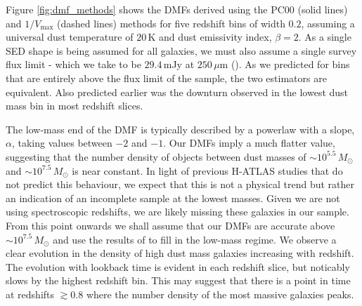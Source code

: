 Figure \ref{fig:dmf_methods} shows the DMFs derived using the PC00 (solid lines) and $1/V_{\textrm{max}}$ (dashed lines) methods for five redshift bins of width $0.2$, assuming a universal dust temperature of $20\,$K and dust emissivity index, $\beta = 2$. As a single SED shape is being assumed for all galaxies, we must also assume a single survey flux limit - which we take to be $29.4\,$mJy at $250\,\mu$m (\citealt{Valiante_2016}). As we predicted for bins that are entirely above the flux limit of the sample, the two estimators are equivalent. Also predicted earlier was the downturn observed in the lowest dust mass bin in most redshift slices.

The low-mass end of the DMF is typically described by a powerlaw with a slope, $\alpha$, taking values between $-2$ and $-1$. Our DMFs imply a much flatter value, suggesting that the number density of objects between dust masses of $\sim 10^{5.5}\,M_{\odot}$ and $\sim 10^{7.5}\,M_{\odot}$ is near constant. In light of previous H-ATLAS studies that do not predict this behaviour, we expect that this is not a physical trend but rather an indication of an incomplete sample at the lowest masses. Given we are not using spectroscopic redshifts, we are likely missing these galaxies in our sample. From this point onwards we shall assume that our DMFs are accurate above $\sim 10^{7.5}\,M_{\odot}$ and use the results of \citealt{Beeston_2018} to fill in the low-mass regime. We observe a clear evolution in the density of high dust mass galaxies increasing with redshift. The evolution with lookback time is evident in each redshift slice, but noticably slows by the highest redshift bin. This may suggest that there is a point in time at redshifts $\gtrsim 0.8$ where the number density of the most massive galaxies peaks. 

